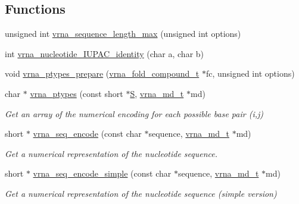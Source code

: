 \subsection*{Functions}
\begin{DoxyCompactItemize}
\item 
unsigned int \mbox{\hyperlink{group__utils_ga0fe05749df8bae9d2eda9013d6ba5551}{vrna\+\_\+sequence\+\_\+length\+\_\+max}} (unsigned int options)
\item 
int \mbox{\hyperlink{group__utils_ga2ee2b98985e6335910f128c81c8f5842}{vrna\+\_\+nucleotide\+\_\+\+I\+U\+P\+A\+C\+\_\+identity}} (char a, char b)
\item 
void \mbox{\hyperlink{group__utils_gafa82673941b3bbb8006e9ca105fa33b9}{vrna\+\_\+ptypes\+\_\+prepare}} (\mbox{\hyperlink{group__fold__compound_ga1b0cef17fd40466cef5968eaeeff6166}{vrna\+\_\+fold\+\_\+compound\+\_\+t}} $\ast$fc, unsigned int options)
\item 
char $\ast$ \mbox{\hyperlink{group__utils_ga51a9e86a5f731f5f2f5584ee67cee4a8}{vrna\+\_\+ptypes}} (const short $\ast$\mbox{\hyperlink{group__energy__parameters__rw_gga7bf2bb363bcf5ce50d60255d256e5682af1ce01387d2348f8b858721a7db81670}{S}}, \mbox{\hyperlink{group__model__details_ga1f8a10e12a0a1915f2a4eff0b28ea17c}{vrna\+\_\+md\+\_\+t}} $\ast$md)
\begin{DoxyCompactList}\small\item\em Get an array of the numerical encoding for each possible base pair (i,j) \end{DoxyCompactList}\item 
short $\ast$ \mbox{\hyperlink{group__utils_ga636e7d6f888fd639587296a5eddea660}{vrna\+\_\+seq\+\_\+encode}} (const char $\ast$sequence, \mbox{\hyperlink{group__model__details_ga1f8a10e12a0a1915f2a4eff0b28ea17c}{vrna\+\_\+md\+\_\+t}} $\ast$md)
\begin{DoxyCompactList}\small\item\em Get a numerical representation of the nucleotide sequence. \end{DoxyCompactList}\item 
short $\ast$ \mbox{\hyperlink{group__utils_ga3cd79d21d53248ad2634c1c0d43e97d7}{vrna\+\_\+seq\+\_\+encode\+\_\+simple}} (const char $\ast$sequence, \mbox{\hyperlink{group__model__details_ga1f8a10e12a0a1915f2a4eff0b28ea17c}{vrna\+\_\+md\+\_\+t}} $\ast$md)
\begin{DoxyCompactList}\small\item\em Get a numerical representation of the nucleotide sequence (simple version) \end{DoxyCompactList}\item 

\end{DoxyCompactItemize}
